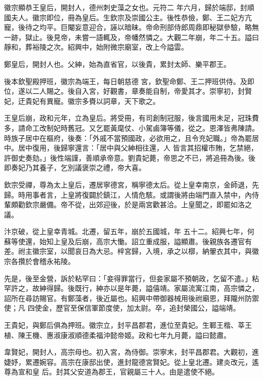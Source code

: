 \begin{pinyinscope}
 徽宗顯恭王皇后，開封人，德州刺史藻之女也。元符二
 年六月，歸於端邸，封順國夫人。徽宗即位，冊為皇后。生欽宗及崇國公主。後性恭儉，鄭、王二妃方亢寵，後待之均平。巨閹妄意迎合，誣以暗昧。帝命刑部侍郎周鼎即秘獄參驗，略無一跡，獄止。後見帝，未嘗一語輒及，帝幡然憐之。大觀二年崩，年二十五。謚曰靜和，葬裕陵之次。紹興中，始附微宗廟室，改上今謚雲。



 鄭皇后，開封人也。父紳，始為直省官，以後貴，累封太師、樂平郡王。



 後本欽聖殿押班，徽宗為端王，每日朝慈德
 宮，欽聖命鄭、王二押班供侍。及即位，遂以二人賜之。後自入宮，好觀書，章奏能自制，帝愛其才。崇寧初，封賢妃，迂貴妃有異寵。徽宗多賚以詞章，天下歌之。



 王皇后崩，政和元年，立為皇后。將受冊，有司創制冠服，後言國用未足，冠珠費多，請命工改制妃時舊冠。又乞罷黃麾仗、小駕鹵簿等儀，從之。恩澤皆弗陳請。時族子居中在樞府，後奏：「外戚不當預國政，必欲用之，且令充妃職。」帝為罷居中。居中復用，後歸寧還言：「居中與父紳相往還，人
 皆言其招權市賄，乞禁絕，許御史奏劾。」後性端謹，善順承帝意。劉貴妃薨，帝思之不已，將追冊為後。後即奏妃乃其養子，乞別議褒崇之禮，帝大喜。



 欽宗受禪，尊為太上皇后，遷居寧德宮，稱寧德太后。從上皇幸南京，金師退，先歸。時用事者言，上皇將復闢於鎮江，人情危駭。或謂後將由端門直入禁中，內侍輩頗勸欽宗嚴備。帝不從，出郊迎後，於是兩宮歡甚洽。上皇聞之，即罷如洛之議。



 汴京破，從上皇幸青城。北遷，留五年，崩於五國城，年
 五十二。紹興七年，何蘇等使還，始知上皇及后崩，高宗大慟。詔立重成服，謚顯肅。後親族各遷官有差。祔主徽宗室，以聞哀日為大忌。梓宮歸，入境，承之以槨，納翬衣其中，與徽宗各攢於會稽永祐陵。



 先是，後至金營，訴於粘罕曰：「妾得罪當行，但妾家屬不預朝政，乞留不遣。」粘罕許之，故紳得歸。後既行，紳亦以是年薨，謚僖靖。家屬流寓江南，高宗憐之，詔所在尋訪賜官。有鄭藻者，後近屬也。紹興中帶御器械用後祔廟恩，拜隴州防禦使；凡
 四使金，歷官至保信軍節度使，加太尉。卒，追封榮國公，謚端靖。



 王貴妃，與鄭后俱為押班。徽宗立，封平昌郡君，進位至貴妃。生鄆王楷、莘王植、陳王機、惠淑康淑順德柔福沖懿帝姬。政和七年九月薨，謚曰懿肅。



 韋賢妃，開封人，高宗母也。初入宮，為侍御。崇寧末，封平昌郡君。大觀初，進婕妤，累遷婉容。高宗在康邸出使，進封龍德宮賢妃。從上皇北遷。建炎改元，遙尊為宣和皇
 后。封其父安道為郡王，官親屬三十人。由是遣使不絕。




\end{pinyinscope}
